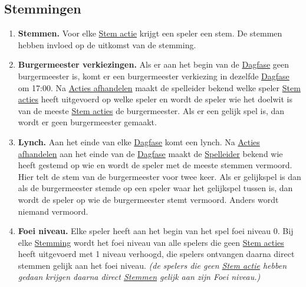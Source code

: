 \documentclass{article}
\newenvironment{rulesubsection}[1]{
    \subsection{#1} \label{rule:#1}
    \begin{enumerate}[label=\thesubsection.\arabic{enumi}]
}{
    \end{enumerate}
}
\newcommand{\ruleitem}[1]{\item \label{rule:#1} \textbf{#1.}}
\newcommand{\ruleref}[1]{\hyperref[rule:#1]{#1}}
\begin{document}
\begin{rulesubsection}{Stemmingen}
    \ruleitem{Stemmen} Voor elke \hyperref[rule:Stem acties]{Stem actie} krijgt een speler een stem. De stemmen hebben invloed op de uitkomst van de stemming.
    \ruleitem{Burgermeester verkiezingen} Als er aan het begin van de \ruleref{Dagfase} geen burgermeester is, komt er een burgermeester verkiezing in dezelfde \ruleref{Dagfase}
    om 17:00. Na \ruleref{Acties afhandelen} maakt de spelleider bekend welke speler \ruleref{Stem acties} heeft uitgevoerd op welke speler en wordt de speler wie het doelwit 
    is van de meeste \ruleref{Stem acties} de burgermeester.
    Als er een gelijk spel is, dan wordt er geen burgermeester gemaakt.

    \ruleitem{Lynch} Aan het einde van elke \ruleref{Dagfase} komt een lynch. Na \ruleref{Acties afhandelen} aan het einde van de \ruleref{Dagfase} maakt de \ruleref{Spelleider} bekend
    wie heeft gestemd op wie en wordt de speler met de meeste stemmen vermoord. Hier telt de stem van de burgermeester voor twee keer. Als er gelijkspel is dan als de burgermeester stemde
    op een speler waar het gelijkspel tussen is, dan wordt de speler op wie de burgermeester stemt vermoord. Anders wordt niemand vermoord.
    \ruleitem{Foei niveau} Elke speler heeft aan het begin van het spel foei niveau 0. Bij elke \hyperref[rule:Stemmingen]{Stemming} wordt het foei niveau van alle spelers die geen \ruleref{Stem acties} heeft uitgevoerd
    met 1 niveau verhoogd, die spelers ontvangen daarna direct stemmen gelijk aan het foei niveau. \textit{(de spelers die geen \hyperref[rule:Stem acties]{Stem actie} hebben gedaan krijgen daarna direct \ruleref{Stemmen} gelijk aan zijn Foei niveau.)}
\end{rulesubsection}
\end{document}
